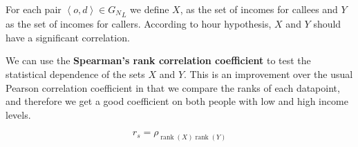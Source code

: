 For each pair \( \left< o, d \right> \in {G_N}_L \) we define \( X \), as the set of incomes for callees and \( Y \) as the set of incomes for callers. According to hour hypothesis, \( X \) and \( Y \) should have a significant correlation.

We can use the \textbf{Spearman's rank correlation coefficient} to test the statistical dependence of the sets \( X \) and \( Y \). This is an improvement over the usual Pearson correlation coefficient in that we compare the ranks of each datapoint, and therefore we get a good coefficient on both people with low and high income levels.

\[
r_s = \rho_{\operatorname{rank}(X) \operatorname{rank}(Y)}
\]